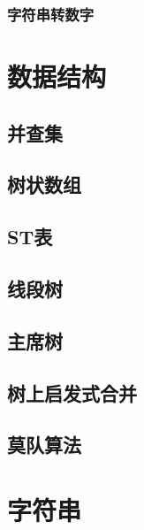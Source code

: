 \documentclass[10pt,a4paper]{article}
\begin{document}
\subsubsection{字符串转数字}

\section{数据结构}
\subsection{并查集}
\begin{spacing}{1.5}

\end{spacing}

\subsection{树状数组}

\subsection{ST表}

\subsection{线段树}
\begin{spacing}{1.5}

\end{spacing}

\subsection{主席树}
\begin{spacing}{1.5}

\end{spacing}

\subsection{树上启发式合并}

\subsection{莫队算法}
\begin{spacing}{1.5}

\end{spacing}

\section{字符串}
\end{document}
